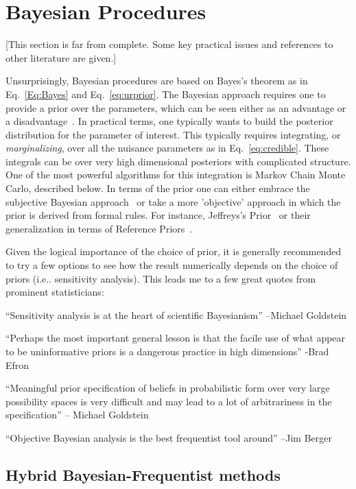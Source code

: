 \documentclass{cernrep}
\begin{document}
\section{Bayesian Procedures}

[This section is far from complete.  Some key practical issues and references to other literature are given.]

Unsurprisingly, Bayesian procedures are based on Bayes's theorem as in Eq.~\ref{Eq:Bayes} and Eq.~\ref{eq:urprior}.  The Bayesian approach requires one to provide a prior over the parameters, which can be seen either as an advantage or a disadvantage~\cite{DAgostiniInference,Cousins:1994yw}.  In practical terms, one typically wants to build the posterior distribution for the parameter of interest.  This typically requires integrating, or \textit{marginalizing}, over all the nuisance parameters as in Eq.~\ref{eq:credible}.  These integrals can be over very high dimensional posteriors with complicated structure.  One of the most powerful algorithms for this integration is Markov Chain Monte Carlo, described below.  In terms of the prior one can either embrace the subjective Bayesian approach~\cite{Jaynes:2003fk} or take a more 'objective' approach in which the prior is derived from formal rules.  For instance, Jeffreys's Prior~\cite{JeffreysPrior} or their generalization in terms of Reference Priors~\cite{Demortier:2010sn}.  

Given the logical importance of the choice of prior, it is generally recommended to try a few options to see how the result numerically depends on the choice of priors (i.e.. sensitivity analysis).  This leads me to a few great quotes from prominent statisticians:

``Sensitivity analysis is at the heart of scientific Bayesianism'' --Michael Goldstein

``Perhaps the most important general lesson is that the facile use of what appear to be uninformative priors is a dangerous practice in high dimensions'' -Brad Efron

``Meaningful prior specification of beliefs in probabilistic form over very large possibility spaces is very difficult and may lead to a lot of arbitrariness in the specification'' -- Michael Goldstein


``Objective Bayesian analysis is the best frequentist tool around'' --Jim Berger

\subsection{Hybrid Bayesian-Frequentist methods}
\end{document}
